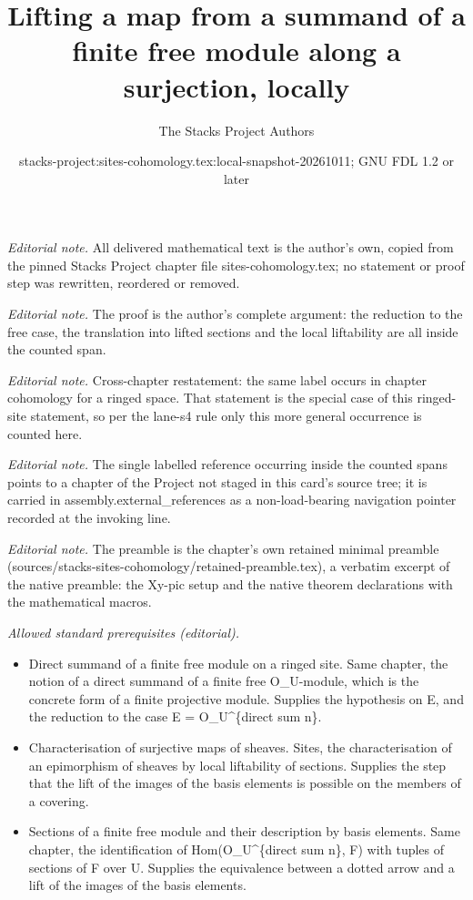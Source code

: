 \documentclass[10pt,a4paper]{amsart}
\title{Lifting a map from a summand of a finite free module along a surjection, locally}
\author{The Stacks Project Authors}
\date{stacks-project:sites-cohomology.tex:local-snapshot-20261011; GNU FDL 1.2 or later}
\theoremstyle{plain}
\theoremstyle{definition}
\theoremstyle{remark}
\numberwithin{equation}{subsection}
\begin{document}
\maketitle
\noindent\textit{Editorial note.} All delivered mathematical text is the author's own, copied from the pinned Stacks Project chapter file sites-cohomology.tex; no statement or proof step was rewritten, reordered or removed.\par\medskip
\noindent\textit{Editorial note.} The proof is the author's complete argument: the reduction to the free case, the translation into lifted sections and the local liftability are all inside the counted span.\par\medskip
\noindent\textit{Editorial note.} Cross-chapter restatement: the same label occurs in chapter cohomology for a ringed space. That statement is the special case of this ringed-site statement, so per the lane-s4 rule only this more general occurrence is counted here.\par\medskip
\noindent\textit{Editorial note.} The single labelled reference occurring inside the counted spans points to a chapter of the Project not staged in this card's source tree; it is carried in assembly.external\_references as a non-load-bearing navigation pointer recorded at the invoking line.\par\medskip
\noindent\textit{Editorial note.} The preamble is the chapter's own retained minimal preamble (sources/stacks-sites-cohomology/retained-preamble.tex), a verbatim excerpt of the native preamble: the Xy-pic setup and the native theorem declarations with the mathematical macros.\par\medskip
\noindent\textit{Allowed standard prerequisites (editorial).}\begin{itemize}
\item Direct summand of a finite free module on a ringed site. Same chapter, the notion of a direct summand of a finite free O\_U-module, which is the concrete form of a finite projective module. Supplies the hypothesis on E, and the reduction to the case E = O\_U\textasciicircum{}\{direct sum n\}.
\item Characterisation of surjective maps of sheaves. Sites, the characterisation of an epimorphism of sheaves by local liftability of sections. Supplies the step that the lift of the images of the basis elements is possible on the members of a covering.
\item Sections of a finite free module and their description by basis elements. Same chapter, the identification of Hom(O\_U\textasciicircum{}\{direct sum n\}, F) with tuples of sections of F over U. Supplies the equivalence between a dotted arrow and a lift of the images of the basis elements.
\end{itemize}\medskip
\end{document}
